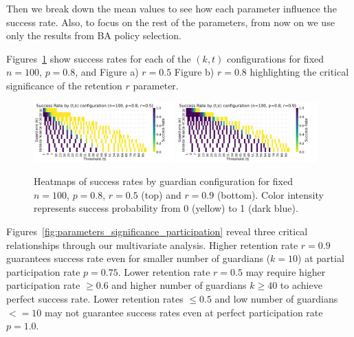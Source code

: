 \documentclass[lettersize,journal]{IEEEtran}
\theoremstyle{definition}
\begin{document}
Then we break down the mean values to see how each parameter influence the success rate. Also, to focus on the rest of the parameters, from now on we use only the results from BA policy selection.

Figures~\ref{fig:guardian_configs} show success rates for each of the $(k,t)$ configurations for fixed $n=100$, $p=0.8$, and Figure a) $r=0.5$ Figure b) $r=0.8$ highlighting the critical significance of the retention $r$ parameter.


\begin{figure}[htbp]
    
        \centering
        \includegraphics[width=0.48\textwidth]{guardian_set_configuration_n100_p0.8_r0.5.png}
        \includegraphics[width=0.48\textwidth]{guardian_set_configuration_n100_p0.8_r0.9.png}
        \label{fig:guardian_set_config_09}

    \caption{Heatmaps of success rates by guardian configuration for fixed $n=100$, $p=0.8$, $r=0.5$ (top) and $r=0.9$ (bottom). Color intensity represents success probability from 0 (yellow) to 1 (dark blue).}
    \label{fig:guardian_configs}
\end{figure}


Figures~\ref{fig:parameters_significance_participation} reveal three critical relationships through our multivariate analysis. Higher retention rate $r=0.9$ guarantees success rate even for smaller number of guardians ($k=10$) at partial participation rate $p=0.75$. Lower retention rate $r=0.5$ may require higher participation rate $\geq0.6$ and higher number of guardians $k\geq40$ to achieve perfect success rate. Lower retention rates $\leq0.5$ and low number of guardians $<=10$ may not guarantee success rates even at perfect participation rate $p=1.0$.
\end{document}
